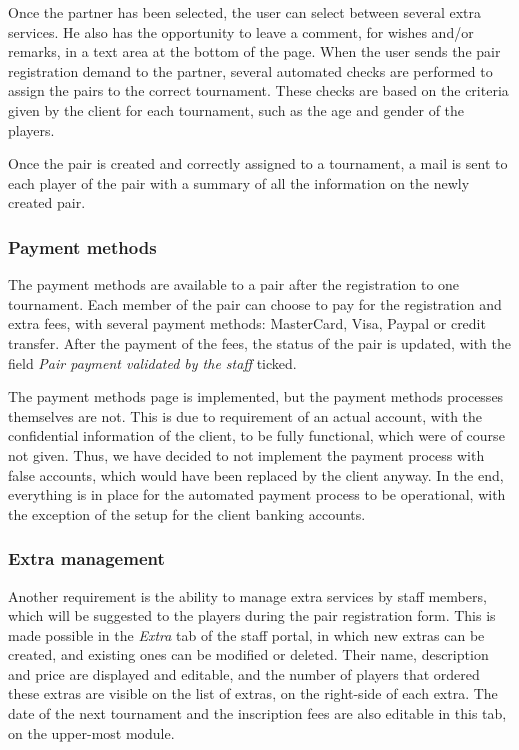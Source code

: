 Once the partner has been selected, the user can select between several extra
services. He also has the opportunity to leave a comment, for wishes and/or
remarks, in a text area at the bottom of the page. When the user sends the
pair registration demand to the partner, several automated checks are performed
to assign the pairs to the correct tournament. These checks are based
on the criteria given by the client for each tournament, such as the age and
gender of the players. \newline

Once the pair is created and correctly assigned to a tournament, a mail
is sent to each player of the pair with a summary of all the information on the
newly created pair.

\subsubsection{Payment methods}
\label{subs:Payment methods}


The payment methods are available to a pair after the registration to one
tournament. Each member of the pair can choose to pay for the registration and
extra fees, with several payment methods: MasterCard, Visa, Paypal or credit
transfer. After the payment of the fees, the status of the pair is updated,
with the field \textit{Pair payment validated by the staff} ticked.\newline

The payment methods page is implemented, but the payment methods processes
themselves are not. This is due to requirement of an actual account,
with the confidential information of the client, to be fully functional,
which were of course not given. Thus, we have decided to not implement
the payment process with false accounts, which would have been replaced
by the client anyway. In the end, everything is in place for the automated
payment process to be operational, with the exception of the setup for the
client banking accounts.

\subsubsection{Extra management}
\label{subs:Extra management}


Another requirement is the ability to manage extra services by staff members,
which will be suggested to the players during the pair registration form.
This is made possible in the \textit{Extra} tab of the staff portal, in which
new extras can be created, and existing ones can be modified or deleted.
Their name, description and price are displayed and editable,
and the number of players that ordered these extras are visible on the list
of extras, on the right-side of each extra. The date of the next tournament
and the inscription fees are also editable in this tab,
on the upper-most module.

